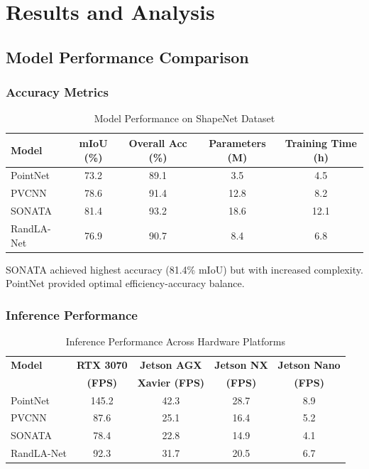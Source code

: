 \documentclass[12pt,a4paper]{report}
\begin{document}
\chapter{Results and Analysis}

\section{Model Performance Comparison}

\subsection{Accuracy Metrics}

\begin{table}[htbp]
\centering
\caption{Model Performance on ShapeNet Dataset}
\label{tab:model_performance}
\begin{tabular}{@{}lcccc@{}}
\toprule
\textbf{Model} & \textbf{mIoU (\%)} & \textbf{Overall Acc (\%)} & \textbf{Parameters (M)} & \textbf{Training Time (h)} \\
\midrule
PointNet & 73.2 & 89.1 & 3.5 & 4.5 \\
PVCNN & 78.6 & 91.4 & 12.8 & 8.2 \\
SONATA & 81.4 & 93.2 & 18.6 & 12.1 \\
RandLA-Net & 76.9 & 90.7 & 8.4 & 6.8 \\
\bottomrule
\end{tabular}
\end{table}

SONATA achieved highest accuracy (81.4\% mIoU) but with increased complexity. PointNet provided optimal efficiency-accuracy balance.

\subsection{Inference Performance}

\begin{table}[htbp]
\centering
\caption{Inference Performance Across Hardware Platforms}
\label{tab:hardware_performance}
\begin{tabular}{@{}lcccc@{}}
\toprule
\textbf{Model} & \textbf{RTX 3070} & \textbf{Jetson AGX} & \textbf{Jetson NX} & \textbf{Jetson Nano} \\
& \textbf{(FPS)} & \textbf{Xavier (FPS)} & \textbf{(FPS)} & \textbf{(FPS)} \\
\midrule
PointNet & 145.2 & 42.3 & 28.7 & 8.9 \\
PVCNN & 87.6 & 25.1 & 16.4 & 5.2 \\
SONATA & 78.4 & 22.8 & 14.9 & 4.1 \\
RandLA-Net & 92.3 & 31.7 & 20.5 & 6.7 \\
\bottomrule
\end{tabular}
\end{table}
\end{document}
